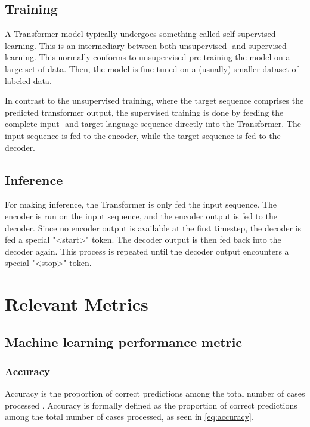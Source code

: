 \subsection{Training}
\label{sec:transformer-training}
A Transformer model typically undergoes something called self-supervised learning. This is an intermediary between both unsupervised- and supervised learning. This normally conforms to unsupervised pre-training the model on a large set of data. Then, the model is fine-tuned on a (usually) smaller dataset of labeled data.

In contrast to the unsupervised training, where the target sequence comprises the predicted transformer output, the supervised training is done by feeding the complete input- and target language sequence directly into the Transformer. The input sequence is fed to the encoder, while the target sequence is fed to the decoder.

\subsection{Inference}
\label{sec:transformer-inference}
For making inference, the Transformer is only fed the input sequence. The encoder is run on the input sequence, and the encoder output is fed to the decoder. Since no encoder output is available at the first timestep, the decoder is fed a special "<start>" token. The decoder output is then fed back into the decoder again. This process is repeated until the decoder output encounters a special "<stop>" token.

\section{Relevant Metrics}
\label{sec:metrics}

\subsection{Machine learning performance metric}
\label{sec:performance-metric}

\subsubsection{Accuracy}
\label{sec:accuracy}
Accuracy is the proportion of correct predictions among the total number of cases processed \cite{accuracy}. Accuracy is formally defined as the proportion of correct predictions among the total number of cases processed, as seen in \cref{eq:accuracy}.

